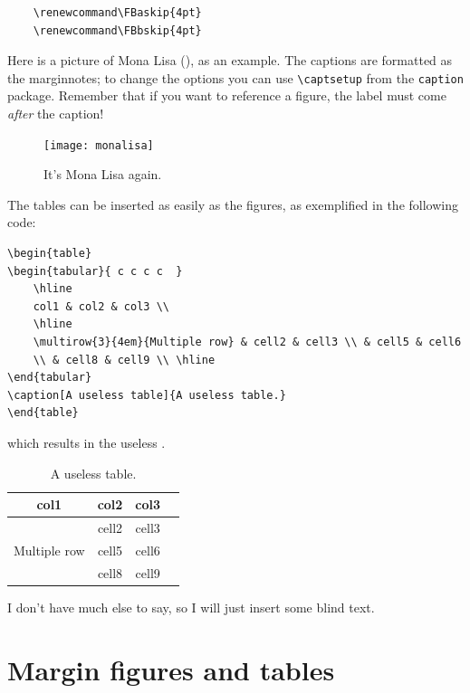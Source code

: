 \begin{verbatim}
	\renewcommand\FBaskip{4pt}
	\renewcommand\FBbskip{4pt}
\end{verbatim}

Here is a picture of Mona Lisa (), as an example. 
The captions are formatted as the marginnotes; to change the options you 
can use \verb|\captsetup| from the \verb|caption| package. Remember that 
if you want to reference a figure, the label must come \emph{after} the 
caption!

\begin{figure}[h]
	\texttt{[image: monalisa]}
	\caption[Mona Lisa, again]{It's Mona Lisa again. \blindtext}
\end{figure}

The tables can be inserted as easily as the figures, as exemplified in 
the following code:

\begin{lstlisting}
\begin{table}
\begin{tabular}{ c c c c  }
	\hline
	col1 & col2 & col3 \\
	\hline
	\multirow{3}{4em}{Multiple row} & cell2 & cell3 \\ & cell5 & cell6 
	\\ & cell8 & cell9 \\ \hline
\end{tabular}
\caption[A useless table]{A useless table.}
\end{table}
\end{lstlisting}

which results in the useless .

\begin{table}[h]
\begin{tabular}{ c c c c  }
	\hline
	col1 & col2 & col3 \\
	\hline
	\multirow{3}{4em}{Multiple row} & cell2 & cell3 \\ & cell5 & cell6 
	\\ & cell8 & cell9 \\ \hline
\end{tabular}
\caption[A useless table]{A useless table.}
\end{table}

I don't have much else to say, so I will just insert some blind text. 
\blindtext

\section{Margin figures and tables}

